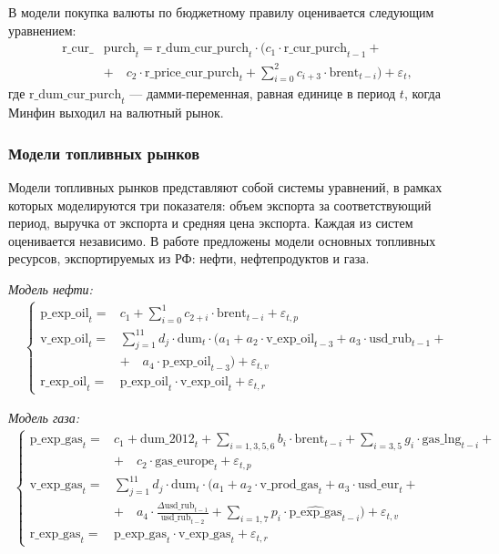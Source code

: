 \documentclass[a4paper, 14pt]{extarticle}
\newcommand{\lsum}{\sum\limits}
\begin{document}
В модели покупка валюты по бюджетному правилу оценивается следующим уравнением:
\begin{align*}
\text{r\_cur\_}&\text{purch}_t = \text{r\_dum\_cur\_purch}_t \cdot (c_1 \cdot \text{r\_cur\_purch}_{t-1} + \\
& + \quad c_2 \cdot \text{r\_price\_cur\_purch}_t + \lsum_{i=0}^2 c_{i+3} \cdot \text{brent}_{t-i}) + \varepsilon_{t},
\end{align*}
где $\text{r\_dum\_cur\_purch}_t$ — дамми-переменная, равная единице в период $t$, когда Минфин выходил на валютный рынок.

\subsubsection{Модели топливных рынков}
Модели топливных рынков представляют собой системы уравнений, в рамках которых моделируются три показателя: объем экспорта за соответствующий период, выручка от экспорта и средняя цена экспорта.
Каждая из систем оценивается независимо.
В работе предложены модели основных топливных ресурсов, экспортируемых из РФ: нефти, нефтепродуктов и газа.
\vspace{5mm}

\textit{Модель нефти:}
\begin{align*} 
\begin{cases}
\text{p\_exp\_oil}_t =&c_1 + \lsum_{i = 0}^{1}c_{2+i} \cdot \text{brent}_{t-i} + \varepsilon_{t,p}\\
\text{v\_exp\_oil}_t =&\lsum_{j = 1}^{11} d_j \cdot \text{dum}_t \cdot(a_1 + a_2 \cdot \text{v\_exp\_oil}_{t-3} + a_3 \cdot \text{usd\_rub}_{t-1} + \\ 
&+ \quad a_4 \cdot \text{p\_exp\_oil}_{t-3}) + \varepsilon_{t,v}\\
\text{r\_exp\_oil}_t =&\text{p\_exp\_oil}_t \cdot \text{v\_exp\_oil}_t + \varepsilon_{t,r}
\end{cases}
\end{align*}

\vspace{5mm}

\textit{Модель газа:}
\begin{align*} 
	\begin{cases}
		\text{p\_exp\_gas}_t =&c_1 + \text{dum\_2012}_t {+} \lsum_{i = 1,3,5,6}b_{i} \cdot \text{brent}_{t-i} + \lsum_{i = 3, 5} g_i \cdot \text{gas\_lng}_{t-i} + \\ 
		&+ \quad c_2 \cdot \text{gas\_europe}_t + \varepsilon_{t,p} \\
		\text{v\_exp\_gas}_t =&\lsum_{j = 1}^{11} d_j \cdot \text{dum}_t \cdot(a_1 + a_2 \cdot \text{v\_prod\_gas}_{t} + a_3 \cdot \text{usd\_eur}_{t} + \\ 
		&+ \quad a_4 \cdot \frac{\Delta\text{usd\_rub}_{t-1}}{\text{usd\_rub}_{t-2}} +
		\lsum_{i = 1, 7} p_i \cdot \widehat{ \text{p\_exp\_gas}}_{t-i})+  \varepsilon_{t,v}\\
		\text{r\_exp\_gas}_t =&\text{p\_exp\_gas}_t \cdot \text{v\_exp\_gas}_t + \varepsilon_{t,r}
	\end{cases}
\end{align*}
\end{document}
